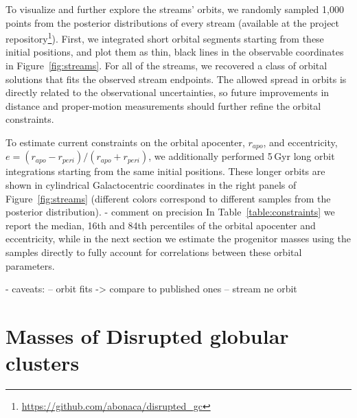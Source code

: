 \documentclass[twocolumn]{aastex63}
\begin{document}
To visualize and further explore the streams' orbits, we randomly sampled 1,000 points from the posterior distributions of every stream (available at the project repository\footnote{\url{https://github.com/abonaca/disrupted_gc}}).
First, we integrated short orbital segments starting from these initial positions, and plot them as thin, black lines in the observable coordinates in Figure~\ref{fig:streams}.
For all of the streams, we recovered a class of orbital solutions that fits the observed stream endpoints.
The allowed spread in orbits is directly related to the observational uncertainties, so future improvements in distance and proper-motion measurements should further refine the orbital constraints.

To estimate current constraints on the orbital apocenter, $r_{apo}$, and eccentricity, $e=(r_{apo} - r_{peri})/(r_{apo} + r_{peri})$, we additionally performed 5\,Gyr long orbit integrations starting from the same initial positions.
These longer orbits are shown in cylindrical Galactocentric coordinates in the right panels of Figure~\ref{fig:streams} (different colors correspond to different samples from the posterior distribution).
- comment on precision
In Table~\ref{table:constraints} we report the median, 16th and 84th percentiles of the orbital apocenter and eccentricity, while in the next section we estimate the progenitor masses using the samples directly to fully account for correlations between these orbital parameters.

- caveats:
-- orbit fits -> compare to published ones
-- stream ne orbit


\section{Masses of Disrupted globular clusters}
\label{sec:disrupted}
\end{document}

